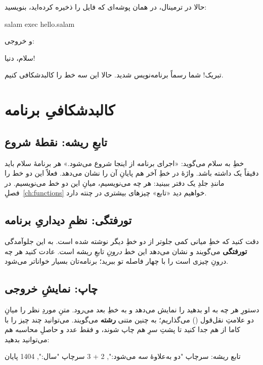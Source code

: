 حالا در ترمینال، در همان پوشه‌ای که فایل را ذخیره کرده‌اید، بنویسید:

\begin{shell}
salam exec hello.salam
\end{shell}

و خروجی:

\begin{progoutfa}
سلام، دنیا!
\end{progoutfa}

تبریک! شما رسماً برنامه‌نویس شدید. حالا این سه خط را کالبدشکافی کنیم.

\section{کالبدشکافیِ برنامه}

\subsection{تابعِ ریشه: نقطهٔ شروع}

خطِ  به سلام می‌گوید: «اجرای برنامه از اینجا شروع می‌شود.»
هر برنامهٔ سلام باید دقیقاً یک  داشته باشد. واژهٔ
 در خطِ آخر هم پایانِ آن را نشان می‌دهد. فعلاً این دو خط را
مانندِ جلدِ یک دفتر ببینید: هر چه می‌نویسیم، میانِ این دو خط می‌نویسیم. در
فصلِ~\ref{ch:functions} خواهیم دید «تابع» چیزهای بیشتری در چنته دارد.

\subsection{تورفتگی: نظمِ دیداریِ برنامه}

دقت کنید که خطِ میانی کمی جلوتر از دو خطِ دیگر نوشته شده است. به این
جلوآمدگی \textbf{تورفتگی} می‌گویند و نشان می‌دهد این خط \emph{درونِ} تابعِ
ریشه است. عادت کنید هر چه درونِ چیزی است را با چهار فاصله تو ببرید؛
برنامه‌تان بسیار خواناتر می‌شود.

\subsection{چاپ: نمایشِ خروجی}

دستورِ  هر چه به او بدهید را نمایش می‌دهد و به خطِ بعد می‌رود.
متنِ موردِ نظر را میانِ دو علامتِ نقل‌قول () می‌گذاریم؛ به چنین
متنی \textbf{رشته} می‌گویند. می‌توانید چند چیز را با کاما از هم جدا کنید تا
پشتِ سرِ هم چاپ شوند، و فقط عدد و حاصلِ محاسبه هم می‌توانید بدهید:

\begin{salamfa}
تابع ریشه:
    سرچاپ "دو به‌علاوهٔ سه می‌شود:", 2 + 3
    سرچاپ "سال:", 1404
پایان
\end{salamfa}

